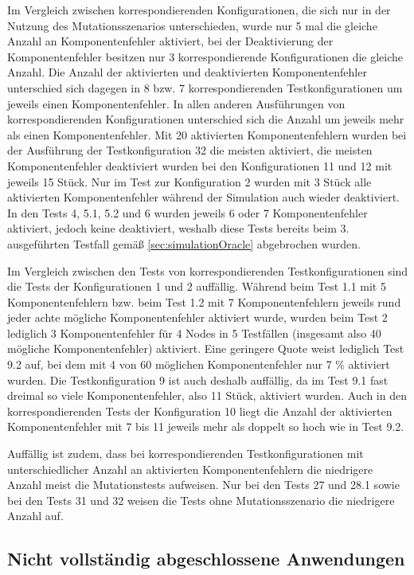 Im Vergleich zwischen korrespondierenden Konfigurationen, die sich nur in der Nutzung des Mutationsszenarios unterschieden, wurde nur 5 mal die gleiche Anzahl an Komponentenfehler aktiviert, bei der Deaktivierung der Komponentenfehler besitzen nur 3 korrespondierende Konfigurationen die gleiche Anzahl.
Die Anzahl der aktivierten und deaktivierten Komponentenfehler unterschied sich dagegen in 8 bzw. 7 korrespondierenden Testkonfigurationen um jeweils einen Komponentenfehler.
In allen anderen Ausführungen von korrespondierenden Konfigurationen unterschied sich die Anzahl um jeweils mehr als einen Komponentenfehler.
Mit 20 aktivierten Komponentenfehlern wurden bei der Ausführung der Testkonfiguration 32 die meisten aktiviert, die meisten Komponentenfehler deaktiviert wurden bei den Konfigurationen 11 und 12 mit jeweils 15 Stück.
Nur im Test zur Konfiguration 2 wurden mit 3 Stück alle aktivierten Komponentenfehler während der Simulation auch wieder deaktiviert.
In den Tests 4, 5.1, 5.2 und 6 wurden jeweils 6 oder 7 Komponentenfehler aktiviert, jedoch keine deaktiviert, weshalb diese Tests bereits beim 3. ausgeführten Testfall gemäß \autoref{sec:simulationOracle} abgebrochen wurden.

Im Vergleich zwischen den Tests von korrespondierenden Testkonfigurationen sind die Tests der Konfigurationen 1 und 2 auffällig.
Während beim Test 1.1 mit 5 Komponentenfehlern bzw. beim Test 1.2 mit 7 Komponentenfehlern jeweils rund jeder achte mögliche Komponentenfehler aktiviert wurde, wurden beim Test 2 lediglich 3 Komponentenfehler für 4 Nodes in 5 Testfällen (insgesamt also 40 mögliche Komponentenfehler) aktiviert.
Eine geringere Quote weist lediglich Test 9.2 auf, bei dem mit 4 von 60 möglichen Komponentenfehler nur 7 \% aktiviert wurden.
Die Testkonfiguration 9 ist auch deshalb auffällig, da im Test 9.1 fast dreimal so viele Komponentenfehler, also 11 Stück, aktiviert wurden.
Auch in den korrespondierenden Tests der Konfiguration 10 liegt die Anzahl der aktivierten Komponentenfehler mit 7 bis 11 jeweils mehr als doppelt so hoch wie in Test 9.2.

Auffällig ist zudem, dass bei korrespondierenden Testkonfigurationen mit unterschiedlicher Anzahl an aktivierten Komponentenfehlern die niedrigere Anzahl meist die Mutationstests aufweisen.
Nur bei den Tests 27 und 28.1 sowie bei den Tests 31 und 32 weisen die Tests ohne Mutationsszenario die niedrigere Anzahl auf.

\subsection{Nicht vollständig abgeschlossene Anwendungen}
\label{sec:failedAppsEval}


